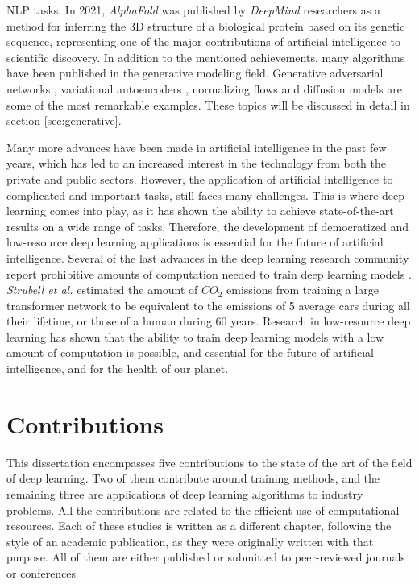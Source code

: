 NLP tasks. In 2021, \textit{AlphaFold} was published by \textit{DeepMind} researchers \autocite{Jumper2021} as a method for inferring the 3D structure of a biological protein based on its genetic sequence, representing one of the major contributions of artificial intelligence to scientific discovery. In addition to the mentioned achievements, many algorithms have been published in the generative modeling field. Generative adversarial networks \autocite{Goodfellow2014}, variational autoencoders \autocite{kingma2019}, normalizing flows \autocite{kingma2016, kobyzev} and diffusion models \autocite{Prafulla2021} are some of the most remarkable examples. These topics will be discussed in detail in section \ref{sec:generative}.

Many more advances have been made in artificial intelligence in the past few years, which has led to an increased interest in the technology from both the private and public sectors. However, the application of artificial intelligence to complicated and important tasks, still faces many challenges. This is where deep learning comes into play, as it has shown the ability to achieve state-of-the-art results on a wide range of tasks. Therefore, the development of democratized and low-resource deep learning applications is essential for the future of artificial intelligence. Several of the last advances in the deep learning research community report prohibitive amounts of computation needed to train deep learning models \autocite{silver2016, kechyn2018, brown2020, floridi2020}. \textit{Strubell et al.} \autocite{strubell2019} estimated the amount of $CO_2$ emissions from training a large transformer network to be equivalent to the emissions of 5 average cars during all their lifetime, or those of a human during 60 years. Research in low-resource deep learning \autocite{howard2017, Han2017, Gao2018, sanchez2020, so2021} has shown that the ability to train deep learning models with a low amount of computation is possible, and essential for the future of artificial intelligence, and for the health of our planet.


\section{Contributions}
This dissertation encompasses five contributions to the state of the art of the field of deep learning. Two of them contribute around training methods, and the remaining three are applications of deep learning algorithms to industry problems. All the contributions are related to the efficient use of computational resources. Each of these studies is written as a different chapter, following the style of an academic publication, as they were originally written with that purpose. All of them are either published or submitted to peer-reviewed journals or conferences

